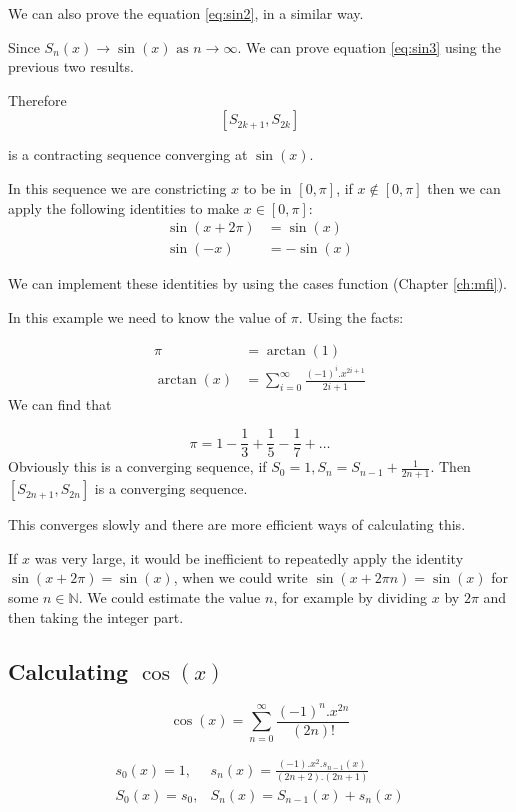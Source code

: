 \documentclass{cs4rep}
\begin{document}
We can also prove the equation \ref{eq:sin2}, in a similar way.

Since $S_{n}(x) \rightarrow \sin(x) \mbox{ as } n \rightarrow \infty$.
We can prove equation \ref{eq:sin3} using the previous two results.

Therefore
\[ [ S_{2k+1}, S_{2k} ] \]

is a contracting sequence converging at $\sin(x)$.

In this sequence we are constricting $x$ to be in $[0,\pi]$, if $x
\not\in [0,\pi]$ then we can apply the following identities to make $x
\in [0,\pi]$:
\[ \begin{array}{rl}
\sin(x+2\pi) & = \sin(x) \\
\sin(-x) & = -\sin(x)
\end{array} \]

We can implement these identities by using the cases function (Chapter \ref{ch:mfi}).

In this example we need to know the value of $\pi$.
Using the facts:

\[ \begin{array}{rl}
\pi & = \arctan(1) \\
\arctan(x) & = \sum_{i=0}^{\infty} \frac{(-1)^{i}.x^{2i+1}}{2i+1}
\end{array} \]
We can find that

\[ \pi = 1 - \frac{1}{3} + \frac{1}{5} - \frac{1}{7} + \ldots \]
Obviously this is a converging sequence, if $S_{0}=1, S_{n} = S_{n-1} + \frac{1}{2n+1} $. Then $[S_{2n+1}, S_{2n}]$ is a converging sequence.

This converges slowly and there are more efficient ways of calculating
this.

If $x$ was very large, it would be inefficient to repeatedly apply the
identity $\sin(x+2\pi) = \sin(x)$, when we could write $\sin(x+2 \pi n)
= \sin(x)$ for some $n \in \mathbb{N}$.  We could estimate the value $n$, for
example by dividing $x$ by $2 \pi$ and then taking the integer part.

\subsection*{Calculating $\cos(x)$}
\[ \cos(x) = \sum_{n=0}^{\infty} \frac{(-1)^{n}.x^{2n}}{(2n)!} \]

\[ \begin{array}{ll}
s_{0}(x) = 1, & s_{n}(x) = \frac{(-1).x^{2}.s_{n-1}(x)}{(2n+2).(2n+1)} \\
S_{0}(x) = s_{0}, & S_{n}(x) = S_{n-1}(x) + s_{n}(x)
\end{array} \]
\end{document}
